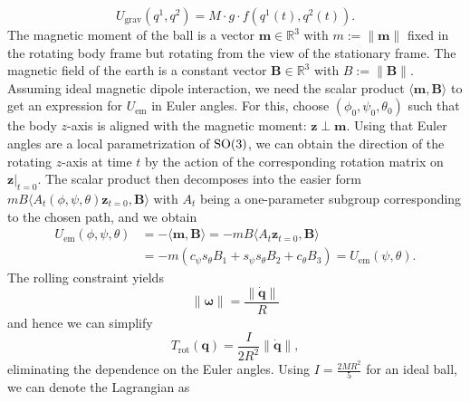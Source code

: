 \[
    U_\text{grav}(q^1,q^2)=M \cdot g \cdot f(q^1(t), q^2(t))
.\]
The magnetic moment of the ball is a vector $\mathbf{m} \in \mathbb{R}^3$ with $m := \|\mathbf{m}\|$ fixed in the rotating body frame but rotating from the view of the stationary frame. The magnetic field of the earth is a constant vector $\mathbf{B} \in \mathbb{R}^3$ with $B:=\|\mathbf{B}\|$. Assuming ideal magnetic dipole interaction, we need the scalar product $\langle \mathbf{m}, \mathbf{B} \rangle$ to get an expression for $U_\text{em}$ in Euler angles. For this, choose $(\phi_0, \psi_0, \theta_0)$ such that the body $z$-axis is aligned with the magnetic moment: $\mathbf{z} \perp \mathbf{m}$. Using that Euler angles are a local parametrization of $\operatorname{SO}(3)$, we can obtain the direction of the rotating $z$-axis at time $t$ by the action of the corresponding rotation matrix on $\mathbf{z}|_{t=0}$. The scalar product then decomposes into the easier form $mB\langle A_t(\phi, \psi, \theta) \mathbf{z}_{t=0}, \mathbf{B} \rangle$ with $A_t$ being a one-parameter subgroup corresponding to the chosen path, and we obtain
\begin{align*}
    U_\text{em} (\phi,\psi,\theta)&= - \langle \mathbf{m}, \mathbf{B} \rangle= - mB \langle A_t \mathbf{z}_{t=0}, \mathbf{B} \rangle\\
                                  &= -m(c_\psi s_\theta B_1+ s_\psi s_\theta B_2 + c_\theta B_3) = U_\text{em}(\psi, \theta).
\end{align*} 
The rolling constraint yields \[
    \|\boldsymbol{\omega}\| = \frac{\|\dot{\boldsymbol{q}}\|}{R}
\] and hence we can simplify \[
T_\text{rot}(\boldsymbol{q})=\frac{I}{2R^2} \|\dot{\boldsymbol{q}}\| 
,\]  eliminating the dependence on the Euler angles. Using $I=\frac{2MR^2}{5}$ for an ideal ball, we can denote the Lagrangian as 
